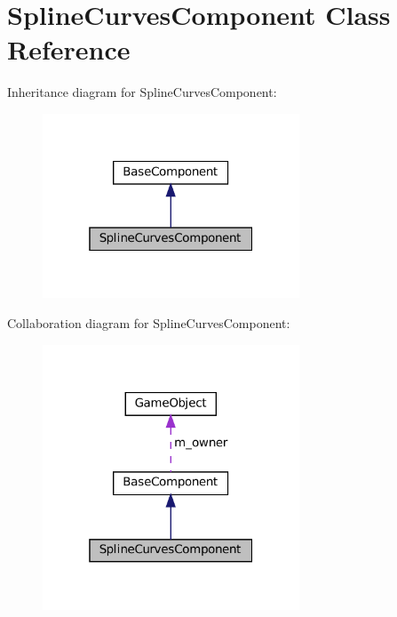 \hypertarget{classSplineCurvesComponent}{}\section{Spline\+Curves\+Component Class Reference}
\label{classSplineCurvesComponent}


Inheritance diagram for Spline\+Curves\+Component\+:
\nopagebreak
\begin{figure}[H]
\begin{center}
\leavevmode
\includegraphics[width=217pt]{classSplineCurvesComponent__inherit__graph}
\end{center}
\end{figure}


Collaboration diagram for Spline\+Curves\+Component\+:
\nopagebreak
\begin{figure}[H]
\begin{center}
\leavevmode
\includegraphics[width=217pt]{classSplineCurvesComponent__coll__graph}
\end{center}
\end{figure}
